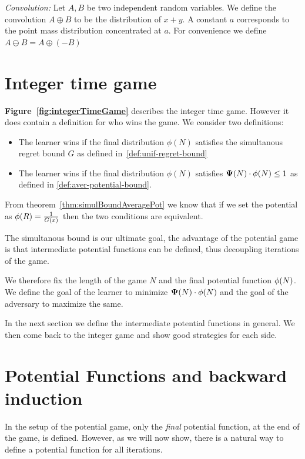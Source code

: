 \documentclass{article}[12pt]
\begin{document}
{\em Convolution:} Let $A,B$ be two independent random variables. We define the
convolution $A \oplus B$ to be the distribution of $x+y$. A constant
$a$ corresponds to the point mass distribution concentrated at
$a$. For convenience we define $A \ominus B = A \oplus (-B)$


\section{Integer time game}
{\bf Figure~\ref{fig:integerTimeGame}} describes the integer time
game. However it does contain a definition for who wins the game. We
consider two definitions:
\begin{itemize}
\item The learner wins if the final distribution $\phi(N)$ satisfies
  the simultanous  regret bound $G$ as defined in~\ref{def:unif-regret-bound}
\item The learner wins if the final distribution $\phi(N)$ satisfies
  ${\bf \Psi}(N) \cdot \phi(N) \leq 1$ as defined in \ref{def:aver-potential-bound}.
\end{itemize}
From theorem~\ref{thm:simulBoundAveragePot} we know that if
we set the potential as $\phi(R) = \frac{1}{G(x)}$ then the two
conditions are equivalent.

The simultanous bound is our ultimate goal, the advantage of the
potential game is that intermediate potential functions can be
defined, thus decoupling iterations of the game.

We therefore fix the length of the game $N$
and the final potential function $\phi(N)$. We define the goal of the
learner to minimize  ${\bf \Psi}(N) \cdot \phi(N)$ and the goal of the
adversary to maximize the same. 

In the next section we define the intermediate potential functions in
general. We then come back to the integer game and show good
strategies for each side.

\section{Potential Functions and backward induction}

 \newcommand{\potPQ}{\pot_{\learnerM,\adversM}}

 In the setup of the potential game, only the {\em final} potential
 function, at the end of the game, is defined. However, as we will now
 show, there is a natural way to define a potential function for all
 iterations.
\end{document}
